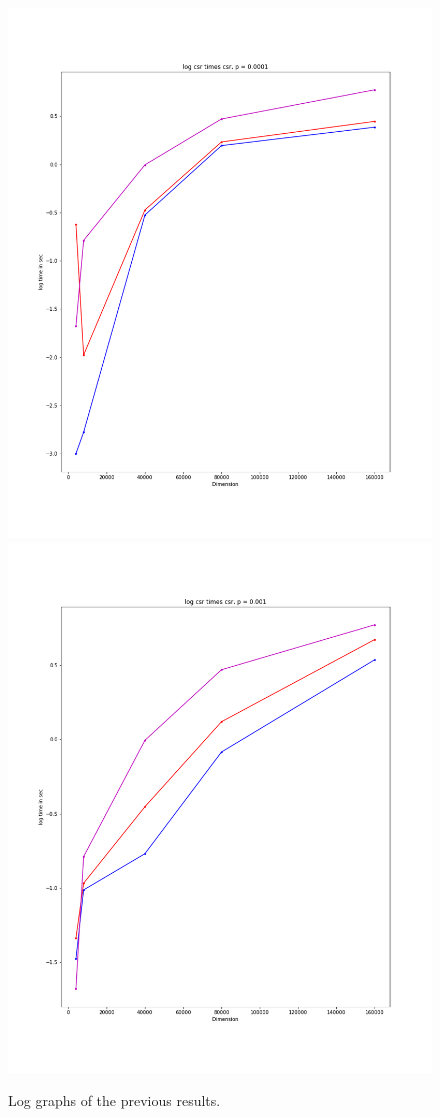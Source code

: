 \documentclass[12pt]{article}
\begin{document}
\begin{figure}[h]
  \caption{Log graphs of the previous results.}
  \includegraphics[scale = 0.16]{log_csr_csr_0001.PNG}
  \includegraphics[scale = 0.16]{log_csr_csr_001.PNG}

\end{figure}
\end{document}
